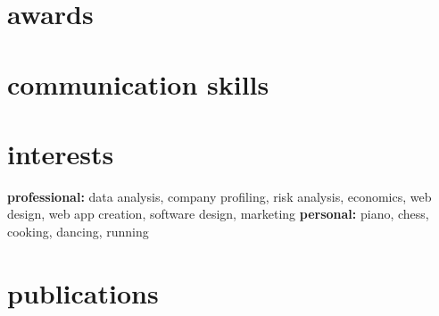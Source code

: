 \documentclass[]{devkhan-cv} %
\begin{document}

\section{awards}

\begin{entrylist}


\end{entrylist}


\section{communication skills}

\begin{entrylist}


\end{entrylist}


\section{interests}

\textbf{professional:} data analysis, company profiling, risk analysis, economics, web design, web app creation, software design, marketing \textbf{personal:} piano, chess, cooking, dancing, running


\section{publications}
\end{document}
